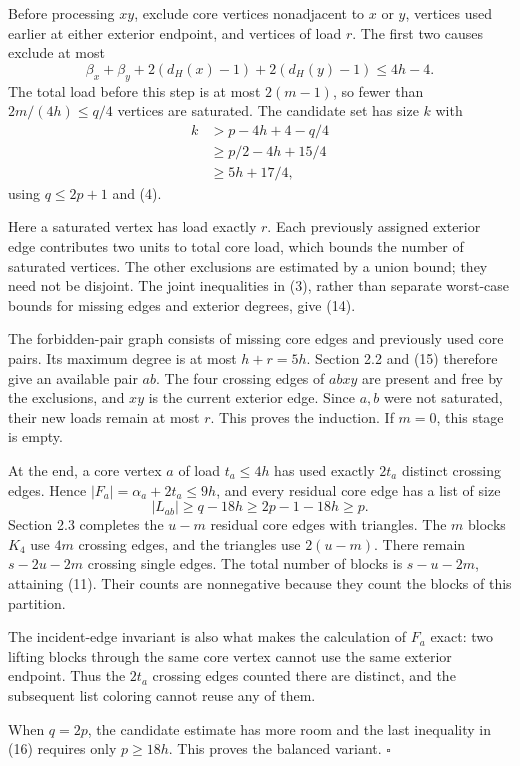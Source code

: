 \documentclass[english,11pt,a4paper]{article}
\begin{document}
Before processing \(xy\), exclude core vertices nonadjacent to \(x\) or
\(y\), vertices used earlier at either exterior endpoint, and vertices
of load \(r\). The first two causes exclude at most \[
\beta_x+\beta_y+2(d_H(x)-1)+2(d_H(y)-1)\le4h-4. \tag{14}
\] The total load before this step is at most \(2(m-1)\), so fewer than
\(2m/(4h)\le q/4\) vertices are saturated. The candidate set has size
\(k\) with \[
\begin{aligned}
k&>p-4h+4-q/4\\
 &\ge p/2-4h+15/4\\
 &\ge5h+17/4,
\end{aligned} \tag{15}
\] using \(q\le2p+1\) and (4).

Here a saturated vertex has load exactly \(r\). Each previously assigned
exterior edge contributes two units to total core load, which bounds the
number of saturated vertices. The other exclusions are estimated by a
union bound; they need not be disjoint. The joint inequalities in (3),
rather than separate worst-case bounds for missing edges and exterior
degrees, give (14).

The forbidden-pair graph consists of missing core edges and previously
used core pairs. Its maximum degree is at most \(h+r=5h\). Section 2.2
and (15) therefore give an available pair \(ab\). The four crossing
edges of \(abxy\) are present and free by the exclusions, and \(xy\) is
the current exterior edge. Since \(a,b\) were not saturated, their new
loads remain at most \(r\). This proves the induction. If \(m=0\), this
stage is empty.

At the end, a core vertex \(a\) of load \(t_a\le4h\) has used exactly
\(2t_a\) distinct crossing edges. Hence \(|F_a|=\alpha_a+2t_a\le9h\),
and every residual core edge has a list of size \[
|L_{ab}|\ge q-18h\ge2p-1-18h\ge p. \tag{16}
\] Section 2.3 completes the \(u-m\) residual core edges with triangles.
The \(m\) blocks \(K_4\) use \(4m\) crossing edges, and the triangles
use \(2(u-m)\). There remain \(s-2u-2m\) crossing single edges. The
total number of blocks is \(s-u-2m\), attaining (11). Their counts are
nonnegative because they count the blocks of this partition.

The incident-edge invariant is also what makes the calculation of
\(F_a\) exact: two lifting blocks through the same core vertex cannot
use the same exterior endpoint. Thus the \(2t_a\) crossing edges counted
there are distinct, and the subsequent list coloring cannot reuse any of
them.

When \(q=2p\), the candidate estimate has more room and the last
inequality in (16) requires only \(p\ge18h\). This proves the balanced
variant. \(\square\)
\end{document}
